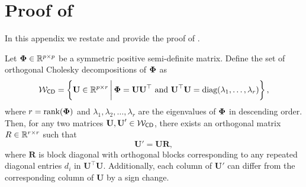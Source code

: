 


\section{Proof of }\label{app:atom}
In this appendix we restate and provide the proof of . 
\begingroup
\renewcommand\thelemma{\ref{lem: ortho}} 
\begin{lemma}%
    Let \( \boldsymbol{\Phi} \in \mathbb{R}^{p \times p} \) be a symmetric positive semi-definite matrix. Define the set of orthogonal Cholesky decompositions of \( \boldsymbol{\Phi} \) as
    \[
        {\mathcal{W}}_{\textsf{CD}} = \left\{ \textbf{U} \in \mathbb{R}^{p \times r} \,\bigg|\, \boldsymbol{\Phi} = \textbf{U} \textbf{U}^\top \text{ and } \textbf{U}^\top \textbf{U} = \text{diag}(\lambda_1,\ldots, \lambda_r) \right\},
    \]
    where \( r = \text{rank}(\boldsymbol{\Phi}) \) and \( \lambda_1, \lambda_2, \ldots, \lambda_r \) are the eigenvalues of $\boldsymbol{\Phi}$ in descending order. Then, for any two matrices \( \textbf{U}, \textbf{U}' \in {\mathcal{W}}_{\textsf{CD}} \), there exists an orthogonal matrix \( R \in \mathbb{R}^{r \times r} \) such that
    \[
        \textbf{U}' = \textbf{U} \textbf{R},
    \]
    where \( \textbf{R} \) is block diagonal with orthogonal blocks corresponding to any repeated diagonal entries \( d_i \) in \( \textbf{U}^\top \textbf{U} \). Additionally, each column of \( \textbf{U}' \) can differ from the corresponding column of \( \textbf{U} \) by a sign change.
\end{lemma}
\endgroup


